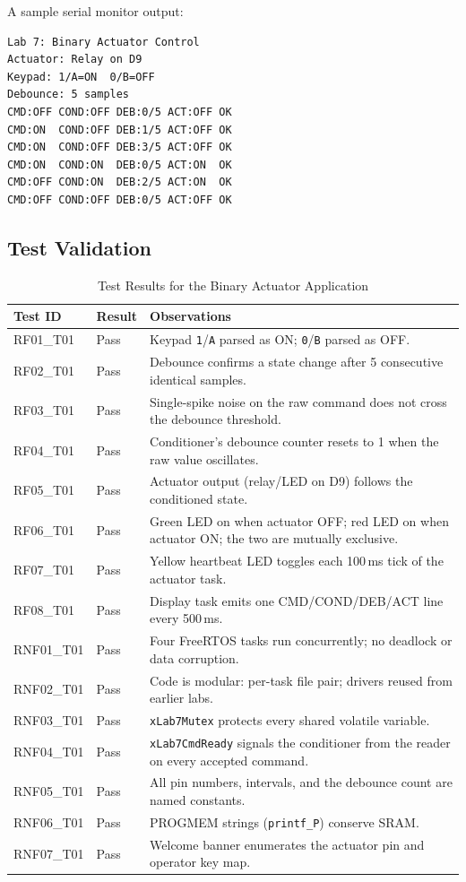 \documentclass[12pt]{article}
\begin{document}
A sample serial monitor output:

\begin{lstlisting}
Lab 7: Binary Actuator Control
Actuator: Relay on D9
Keypad: 1/A=ON  0/B=OFF
Debounce: 5 samples
CMD:OFF COND:OFF DEB:0/5 ACT:OFF OK
CMD:ON  COND:OFF DEB:1/5 ACT:OFF OK
CMD:ON  COND:OFF DEB:3/5 ACT:OFF OK
CMD:ON  COND:ON  DEB:0/5 ACT:ON  OK
CMD:OFF COND:ON  DEB:2/5 ACT:ON  OK
CMD:OFF COND:OFF DEB:0/5 ACT:OFF OK
\end{lstlisting}

\subsection{Test Validation}

\begin{table}[H]
\centering
\begin{tabular}{@{}llp{7.5cm}@{}}
\toprule
\textbf{Test ID} & \textbf{Result} & \textbf{Observations} \\
\midrule
RF01\_T01  & Pass & Keypad \texttt{1}/\texttt{A} parsed as ON; \texttt{0}/\texttt{B} parsed as OFF. \\
RF02\_T01  & Pass & Debounce confirms a state change after 5 consecutive identical samples. \\
RF03\_T01  & Pass & Single-spike noise on the raw command does not cross the debounce threshold. \\
RF04\_T01  & Pass & Conditioner's debounce counter resets to 1 when the raw value oscillates. \\
RF05\_T01  & Pass & Actuator output (relay/LED on D9) follows the conditioned state. \\
RF06\_T01  & Pass & Green LED on when actuator OFF; red LED on when actuator ON; the two are mutually exclusive. \\
RF07\_T01  & Pass & Yellow heartbeat LED toggles each 100\,ms tick of the actuator task. \\
RF08\_T01  & Pass & Display task emits one CMD/COND/DEB/ACT line every 500\,ms. \\
RNF01\_T01 & Pass & Four FreeRTOS tasks run concurrently; no deadlock or data corruption. \\
RNF02\_T01 & Pass & Code is modular: per-task file pair; drivers reused from earlier labs. \\
RNF03\_T01 & Pass & \texttt{xLab7Mutex} protects every shared volatile variable. \\
RNF04\_T01 & Pass & \texttt{xLab7CmdReady} signals the conditioner from the reader on every accepted command. \\
RNF05\_T01 & Pass & All pin numbers, intervals, and the debounce count are named constants. \\
RNF06\_T01 & Pass & PROGMEM strings (\texttt{printf\_P}) conserve SRAM. \\
RNF07\_T01 & Pass & Welcome banner enumerates the actuator pin and operator key map. \\
\bottomrule
\end{tabular}
\caption{Test Results for the Binary Actuator Application}
\label{tab:tests}
\end{table}
\end{document}
